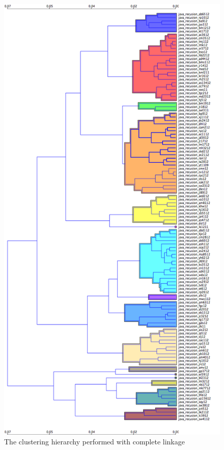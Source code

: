 \begin{figure}[p]

	\centering
		\includegraphics[width=1.2\textwidth]{Figures/RecursionClustering}
	\caption{The clustering hierarchy performed with complete linkage}
	\label{fig:recursionHierarchy}

\end{figure}


